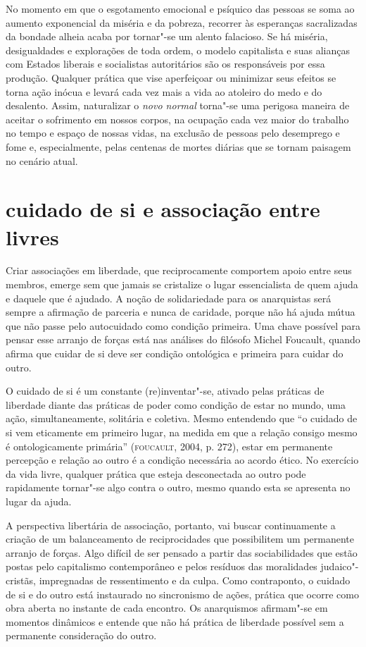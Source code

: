 No momento em que o esgotamento emocional e psíquico das pessoas se soma
ao aumento exponencial da miséria e da pobreza, recorrer às esperanças
sacralizadas da bondade alheia acaba por tornar"-se um alento falacioso.
Se há miséria, desigualdades e explorações de toda ordem, o modelo
capitalista e suas alianças com Estados liberais e socialistas
autoritários são os responsáveis por essa produção. Qualquer prática que
vise aperfeiçoar ou minimizar seus efeitos se torna ação inócua e levará
cada vez mais a vida ao atoleiro do medo e do desalento. Assim,
naturalizar o \emph{novo normal} torna"-se uma perigosa maneira de
aceitar o sofrimento em nossos corpos, na ocupação cada vez maior do
trabalho no tempo e espaço de nossas vidas, na exclusão de pessoas pelo
desemprego e fome e, especialmente, pelas centenas de mortes diárias que
se tornam paisagem no cenário atual.

\section{cuidado de si e associação entre livres}

Criar associações em liberdade, que reciprocamente comportem apoio entre
seus membros, emerge sem que jamais se cristalize o lugar essencialista
de quem ajuda e daquele que é ajudado. A noção de solidariedade para os
anarquistas será sempre a afirmação de parceria e nunca de caridade,
porque não há ajuda mútua que não passe pelo autocuidado como condição
primeira. Uma chave possível para pensar esse arranjo de forças está nas
análises do filósofo Michel Foucault, quando afirma que cuidar de si
deve ser condição ontológica e primeira para cuidar do outro.

O cuidado de si é um constante (re)inventar"-se, ativado pelas práticas
de liberdade diante das práticas de poder como condição de estar no
mundo, uma ação, simultaneamente, solitária e coletiva. Mesmo entendendo
que ``o cuidado de si vem eticamente em primeiro lugar, na medida em que
a relação consigo mesmo é ontologicamente primária'' (\textsc{foucault}, 2004, p.
272), estar em permanente percepção e relação ao outro é a condição
necessária ao acordo ético. No exercício da vida livre, qualquer prática
que esteja desconectada ao outro pode rapidamente tornar"-se algo contra
o outro, mesmo quando esta se apresenta no lugar da ajuda.

A perspectiva libertária de associação, portanto, vai buscar
continuamente a criação de um balanceamento de reciprocidades que
possibilitem um permanente arranjo de forças. Algo difícil de ser
pensado a partir das sociabilidades que estão postas pelo capitalismo
contemporâneo e pelos resíduos das moralidades judaico"-cristãs,
impregnadas de ressentimento e da culpa. Como contraponto, o cuidado de
si e do outro está instaurado no sincronismo de ações, prática que
ocorre como obra aberta no instante de cada encontro. Os anarquismos
afirmam"-se em momentos dinâmicos e entende que não há prática de
liberdade possível sem a permanente consideração do outro.

